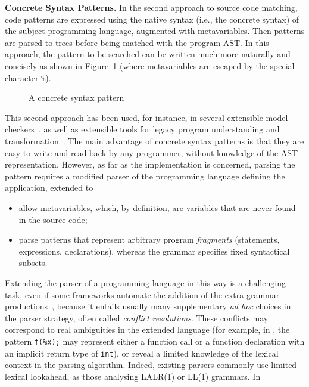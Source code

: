 \noindent\textbf{Concrete Syntax Patterns.} In the second approach to
source code matching, code patterns are expressed using the native
syntax (i.e., the concrete syntax) of the subject programming
language, augmented with meta\-variables. Then patterns are parsed to
trees before being matched with the program AST. In this approach, the
pattern to be searched can be written much more naturally and
concisely as shown in Figure~\ref{intro:concrete_pattern} (where
meta\-variables are escaped by the special character \texttt{\%}).
\begin{figure}
%
\caption{A concrete syntax pattern\label{intro:concrete_pattern}}
\end{figure}
\noindent This second approach has been used, for instance, in several
extensible model checkers~\cite{cecil,mc,mj,blast}, as well as
extensible tools for legacy program understanding and
transformation~\cite{native,behavioral}. The main advantage of
concrete syntax patterns is that they are easy to write and read back
by any programmer, without knowledge of the AST
representation. However, as far as the implementation is concerned,
parsing the pattern requires a modified parser of the programming
language defining the application, extended to
\begin{itemize}

  \item allow meta\-variables, which, by definition, are variables
    that are never found in the source code;

  \item parse patterns that represent arbitrary program
    \emph{fragments} (statements, expressions, declarations), whereas
    the grammar specifies fixed syntactical subsets.
\end{itemize}
Extending the parser of a programming language in this way is a
challenging task, even if some frameworks automate the addition of the
extra grammar productions~\cite{refine}, because it entails usually
many supplementary \emph{ad hoc} choices in the parser strategy, often
called \emph{conflict resolutions}. These conflicts may correspond to
real ambiguities in the extended language (for example, in \Clang, the
pattern \texttt{f(\%x);} may represent either a function call or a
function declaration with an implicit return type of \texttt{int}), or
reveal a limited knowledge of the lexical context in the parsing
algorithm. Indeed, existing parsers commonly use limited lexical
lookahead, as those analysing LALR(1) or LL(1) grammars. In
